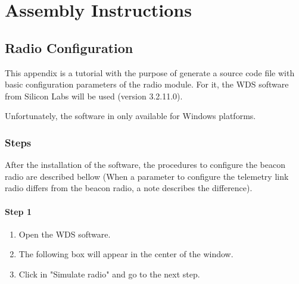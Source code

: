 %
%
%
%
%

%
%
%
%
%
%

\chapter{Assembly Instructions} \label{ch:assembly}

\section{Radio Configuration}

This appendix is a tutorial with the purpose of generate a source code file with basic configuration parameters of the radio module. For it, the WDS software from Silicon Labs will be used (version 3.2.11.0).

Unfortunately, the software in only available for Windows platforms.

\subsection{Steps}

After the installation of the software, the procedures to configure the beacon radio are described bellow (When a parameter to configure the telemetry link radio differs from the beacon radio, a note describes the difference).

\subsubsection{Step 1}

\begin{enumerate}
    \item Open the WDS software.
    \item The following box will appear in the center of the window.
    \item Click in "Simulate radio" and go to the next step.
\end{enumerate}

